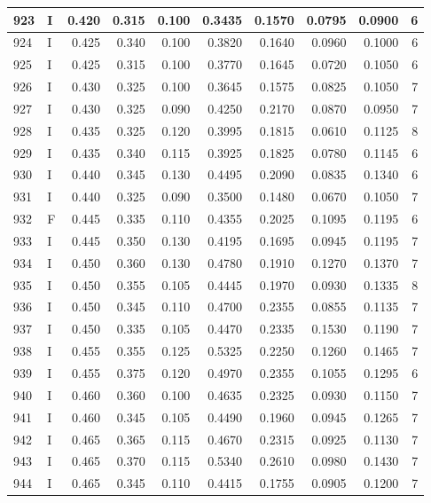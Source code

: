 \documentclass[9pt,twocolumn,twoside,]{pnas-new}
\begin{document}
\begin{tabular}{l|l|r|r|r|r|r|r|r|r}
\hline
923 & I & 0.420 & 0.315 & 0.100 & 0.3435 & 0.1570 & 0.0795 & 0.0900 & 6\\
\hline
924 & I & 0.425 & 0.340 & 0.100 & 0.3820 & 0.1640 & 0.0960 & 0.1000 & 6\\
\hline
925 & I & 0.425 & 0.315 & 0.100 & 0.3770 & 0.1645 & 0.0720 & 0.1050 & 6\\
\hline
926 & I & 0.430 & 0.325 & 0.100 & 0.3645 & 0.1575 & 0.0825 & 0.1050 & 7\\
\hline
927 & I & 0.430 & 0.325 & 0.090 & 0.4250 & 0.2170 & 0.0870 & 0.0950 & 7\\
\hline
928 & I & 0.435 & 0.325 & 0.120 & 0.3995 & 0.1815 & 0.0610 & 0.1125 & 8\\
\hline
929 & I & 0.435 & 0.340 & 0.115 & 0.3925 & 0.1825 & 0.0780 & 0.1145 & 6\\
\hline
930 & I & 0.440 & 0.345 & 0.130 & 0.4495 & 0.2090 & 0.0835 & 0.1340 & 6\\
\hline
931 & I & 0.440 & 0.325 & 0.090 & 0.3500 & 0.1480 & 0.0670 & 0.1050 & 7\\
\hline
932 & F & 0.445 & 0.335 & 0.110 & 0.4355 & 0.2025 & 0.1095 & 0.1195 & 6\\
\hline
933 & I & 0.445 & 0.350 & 0.130 & 0.4195 & 0.1695 & 0.0945 & 0.1195 & 7\\
\hline
934 & I & 0.450 & 0.360 & 0.130 & 0.4780 & 0.1910 & 0.1270 & 0.1370 & 7\\
\hline
935 & I & 0.450 & 0.355 & 0.105 & 0.4445 & 0.1970 & 0.0930 & 0.1335 & 8\\
\hline
936 & I & 0.450 & 0.345 & 0.110 & 0.4700 & 0.2355 & 0.0855 & 0.1135 & 7\\
\hline
937 & I & 0.450 & 0.335 & 0.105 & 0.4470 & 0.2335 & 0.1530 & 0.1190 & 7\\
\hline
938 & I & 0.455 & 0.355 & 0.125 & 0.5325 & 0.2250 & 0.1260 & 0.1465 & 7\\
\hline
939 & I & 0.455 & 0.375 & 0.120 & 0.4970 & 0.2355 & 0.1055 & 0.1295 & 6\\
\hline
940 & I & 0.460 & 0.360 & 0.100 & 0.4635 & 0.2325 & 0.0930 & 0.1150 & 7\\
\hline
941 & I & 0.460 & 0.345 & 0.105 & 0.4490 & 0.1960 & 0.0945 & 0.1265 & 7\\
\hline
942 & I & 0.465 & 0.365 & 0.115 & 0.4670 & 0.2315 & 0.0925 & 0.1130 & 7\\
\hline
943 & I & 0.465 & 0.370 & 0.115 & 0.5340 & 0.2610 & 0.0980 & 0.1430 & 7\\
\hline
944 & I & 0.465 & 0.345 & 0.110 & 0.4415 & 0.1755 & 0.0905 & 0.1200 & 7\\

\end{tabular}
\end{document}
